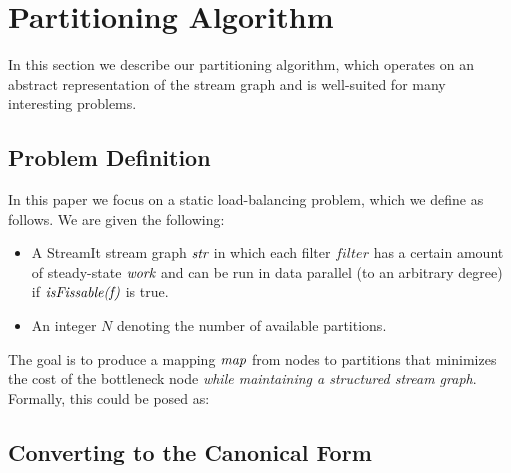 \section{Partitioning Algorithm}

In this section we describe our partitioning algorithm, which operates
on an abstract representation of the stream graph and is well-suited
for many interesting problems.

\subsection{Problem Definition}

In this paper we focus on a static load-balancing problem, which we
define as follows.  We are given the following:
\begin{itemize}

\item A StreamIt stream graph $\mbox{\it str}$ in which each filter $filter$
has a certain amount of steady-state $\mbox{\it work}$ and can be run in
data parallel (to an arbitrary degree) if $\mbox{\it isFissable(f)}$ is
true.

\item An integer $N$ denoting the number of available partitions.

\end{itemize}

The goal is to produce a mapping $\mbox{\it map}$ from nodes to partitions
that minimizes the cost of the bottleneck node {\it while maintaining
a structured stream graph}.  Formally, this could be posed as:





\subsection{Converting to the Canonical Form}


